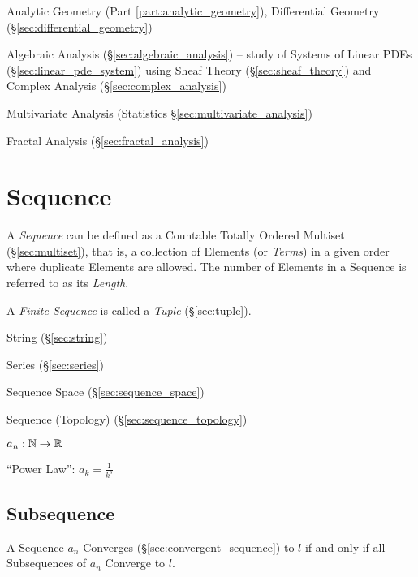 \fist Analytic Geometry (Part \ref{part:analytic_geometry}), Differential
Geometry (\S\ref{sec:differential_geometry})

\fist Algebraic Analysis (\S\ref{sec:algebraic_analysis}) -- study of Systems of
Linear PDEs (\S\ref{sec:linear_pde_system}) using Sheaf Theory
(\S\ref{sec:sheaf_theory}) and Complex Analysis (\S\ref{sec:complex_analysis})

\fist Multivariate Analysis (Statistics \S\ref{sec:multivariate_analysis})

\fist Fractal Analysis (\S\ref{sec:fractal_analysis})



\section{Sequence}\label{sec:sequence}

A \emph{Sequence} can be defined as a Countable Totally Ordered
Multiset (\S\ref{sec:multiset}), that is, a collection of Elements (or
\emph{Terms}) in a given order where duplicate Elements are allowed.
The number of Elements in a Sequence is referred to as its
\emph{Length}.

A \emph{Finite Sequence} is called a \emph{Tuple} (\S\ref{sec:tuple}).

String (\S\ref{sec:string})

Series (\S\ref{sec:series})

Sequence Space (\S\ref{sec:sequence_space})

Sequence (Topology) (\S\ref{sec:sequence_topology})

$a_n : \mathbb{N} \rightarrow \mathbb{R}$

``Power Law'': $a_k = \frac{1}{k^s}$



\subsection{Subsequence}\label{sec:subsequence}

A Sequence $a_n$ Converges (\S\ref{sec:convergent_sequence}) to $l$
if and only if all Subsequences of $a_n$ Converge to $l$.



